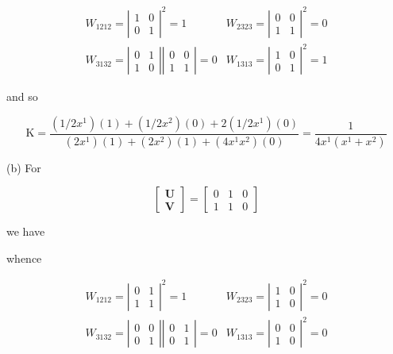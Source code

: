 \documentclass[10pt]{article}
\begin{document}
$$
\begin{array}{ll}
W_{1212}=\left|\begin{array}{ll}
1 & 0 \\
0 & 1
\end{array}\right|^{2}=1 & W_{2323}=\left|\begin{array}{ll}
0 & 0 \\
1 & 1
\end{array}\right|^{2}=0 \\
W_{3132}=\left|\begin{array}{ll}
0 & 1 \\
1 & 0
\end{array}\right|\left|\begin{array}{ll}
0 & 0 \\
1 & 1
\end{array}\right|=0 & W_{1313}=\left|\begin{array}{ll}
1 & 0 \\
0 & 1
\end{array}\right|^{2}=1
\end{array}
$$

and so

$$
\mathrm{K}=\frac{\left(1 / 2 x^{1}\right)(1)+\left(1 / 2 x^{2}\right)(0)+2\left(1 / 2 x^{1}\right)(0)}{\left(2 x^{1}\right)(1)+\left(2 x^{2}\right)(1)+\left(4 x^{1} x^{2}\right)(0)}=\frac{1}{4 x^{1}\left(x^{1}+x^{2}\right)}
$$

(b) For

$$
\left[\begin{array}{l}
\mathbf{U} \\
\mathbf{V}
\end{array}\right]=\left[\begin{array}{lll}
0 & 1 & 0 \\
1 & 1 & 0
\end{array}\right]
$$

we have

whence

$$
\begin{array}{ll}
W_{1212}=\left|\begin{array}{ll}
0 & 1 \\
1 & 1
\end{array}\right|^{2}=1 & W_{2323}=\left|\begin{array}{ll}
1 & 0 \\
1 & 0
\end{array}\right|^{2}=0 \\
W_{3132}=\left|\begin{array}{ll}
0 & 0 \\
0 & 1
\end{array}\right|\left|\begin{array}{ll}
0 & 1 \\
0 & 1
\end{array}\right|=0 & W_{1313}=\left|\begin{array}{ll}
0 & 0 \\
1 & 0
\end{array}\right|^{2}=0
\end{array}
$$
\end{document}
